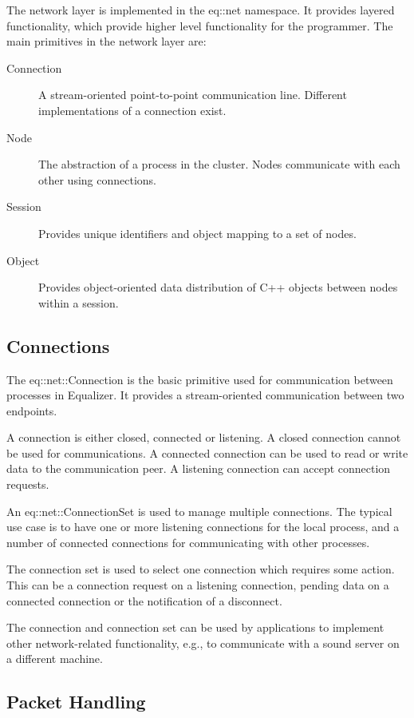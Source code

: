 \documentclass[10pt,a4]{scrartcl}
\begin{document}
The network layer is implemented in the \textsf{eq::net} namespace. It
provides layered functionality, which provide higher level functionality
for the programmer. The main primitives in the network layer are:

\begin{description}
\item[Connection] A stream-oriented point-to-point communication
  line. Different implementations of a connection exist.
\item[Node] The abstraction of a process in the cluster. Nodes
  communicate with each other using connections.
\item[Session] Provides unique identifiers and object mapping to a set
  of nodes.
\item[Object] Provides object-oriented data distribution of C++ objects
  between nodes within a session.
\end{description}

\subsection{Connections}

The \textsf{eq::net::Connection} is the basic primitive used for
communication between processes in Equalizer. It provides a
stream-oriented communication between two endpoints.

A connection is either closed, connected or listening. A closed
connection cannot be used for communications. A connected connection
can be used to read or write data to the communication peer. A listening
connection can accept connection requests.

An \textsf{eq::net::ConnectionSet} is used to manage multiple
connections. The typical use case is to have one or more listening
connections for the local process, and a number of connected connections
for communicating with other processes.

The connection set is used to select one connection which requires some
action. This can be a connection request on a listening connection,
pending data on a connected connection or the notification of a
disconnect.

The connection and connection set can be used by applications to
implement other network-related functionality, e.g., to communicate
with a sound server on a different machine.


\subsection{Packet Handling}
\end{document}
